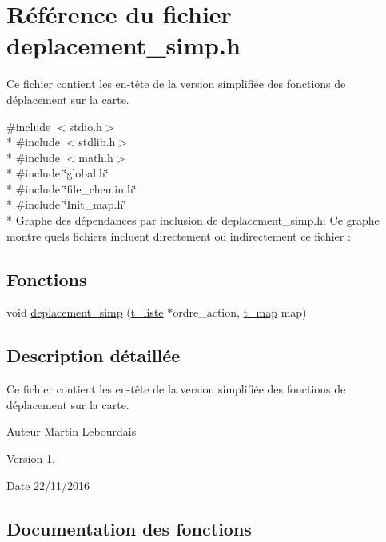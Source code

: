 \hypertarget{a00013}{}\section{Référence du fichier deplacement\+\_\+simp.\+h}
\label{a00013}


Ce fichier contient les en-\/tête de la version simplifiée des fonctions de déplacement sur la carte.  


{\ttfamily \#include $<$stdio.\+h$>$}\\*
{\ttfamily \#include $<$stdlib.\+h$>$}\\*
{\ttfamily \#include $<$math.\+h$>$}\\*
{\ttfamily \#include \char`\"{}global.\+h\char`\"{}}\\*
{\ttfamily \#include \char`\"{}file\+\_\+chemin.\+h\char`\"{}}\\*
{\ttfamily \#include \char`\"{}Init\+\_\+map.\+h\char`\"{}}\\*
Graphe des dépendances par inclusion de deplacement\+\_\+simp.\+h\+:
Ce graphe montre quels fichiers incluent directement ou indirectement ce fichier \+:
\subsection*{Fonctions}
\begin{DoxyCompactItemize}
\item 
void \hyperlink{a00013_a7bfe9afeecd1c63a57d41d1e9fb7ede9}{deplacement\+\_\+simp} (\hyperlink{a00005}{t\+\_\+liste} $\ast$ordre\+\_\+action, \hyperlink{a00006}{t\+\_\+map} map)
\end{DoxyCompactItemize}


\subsection{Description détaillée}
Ce fichier contient les en-\/tête de la version simplifiée des fonctions de déplacement sur la carte. 

\begin{DoxyAuthor}{Auteur}
Martin Lebourdais 
\end{DoxyAuthor}
\begin{DoxyVersion}{Version}
1. 
\end{DoxyVersion}
\begin{DoxyDate}{Date}
22/11/2016 
\end{DoxyDate}


\subsection{Documentation des fonctions}
